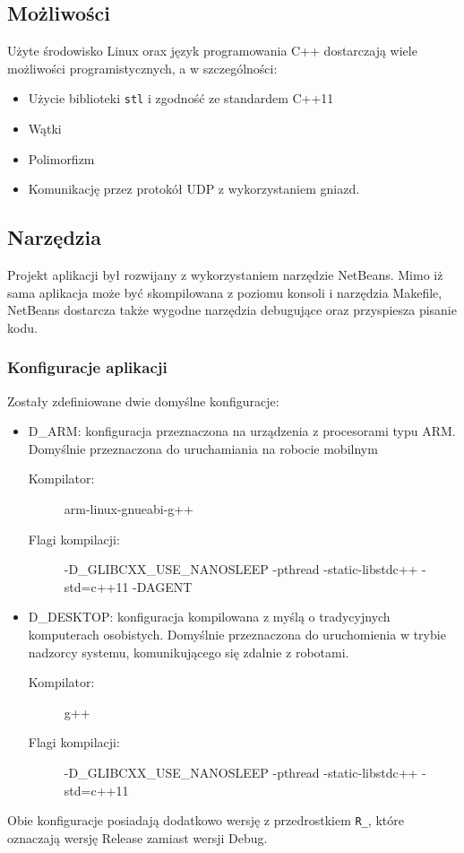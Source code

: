 \subsection{Możliwości}
Użyte środowisko Linux orax język programowania C++ dostarczają wiele możliwości programistycznych, a w szczególności:

\begin{itemize}
    \item Użycie biblioteki {\tt stl} i zgodność ze standardem C++11
    \item Wątki
    \item Polimorfizm
    \item Komunikację przez protokół UDP z wykorzystaniem gniazd.
\end{itemize}

\subsection{Narzędzia}
Projekt aplikacji był rozwijany z wykorzystaniem narzędzie NetBeans. Mimo iż sama aplikacja może być skompilowana z poziomu konsoli i narzędzia Makefile, NetBeans dostarcza także wygodne narzędzia debugujące oraz przyspiesza pisanie kodu.

\subsubsection{Konfiguracje aplikacji}
Zostały zdefiniowane dwie domyślne konfiguracje:
\begin{itemize}
    \item D\_ARM: konfiguracja przeznaczona na urządzenia z procesorami typu ARM. Domyślnie przeznaczona do uruchamiania na robocie mobilnym
    \begin{description}
        \item[{\small Kompilator:}] {\small arm-linux-gnueabi-g++}
        \item[{\small Flagi kompilacji:}] {\small -D\_GLIBCXX\_USE\_NANOSLEEP -pthread -static-libstdc++ -std=c++11 -DAGENT}
    \end{description}
    \item D\_DESKTOP: konfiguracja kompilowana z myślą o tradycyjnych komputerach osobistych. Domyślnie przeznaczona do uruchomienia w trybie nadzorcy systemu, komunikującego się zdalnie z robotami.
    \begin{description}
        \item[{\small Kompilator:}] {\small g++}
        \item[{\small Flagi kompilacji:}] {\small -D\_GLIBCXX\_USE\_NANOSLEEP -pthread -static-libstdc++ -std=c++11}
    \end{description}
\end{itemize}
\noindent Obie konfiguracje posiadają dodatkowo wersję z przedrostkiem {\tt R\_}, które oznaczają wersję Release zamiast wersji Debug.\\

